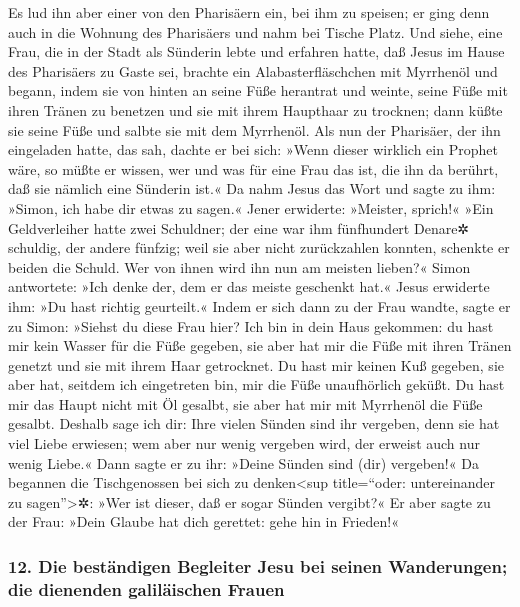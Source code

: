  Es lud ihn aber einer von den Pharisäern ein, bei ihm zu
speisen; er ging denn auch in die Wohnung des Pharisäers und nahm bei
Tische Platz.  Und siehe, eine Frau, die in der Stadt als
Sünderin lebte und erfahren hatte, daß Jesus im Hause des Pharisäers zu
Gaste sei, brachte ein Alabasterfläschchen mit Myrrhenöl 
und begann, indem sie von hinten an seine Füße herantrat und weinte,
seine Füße mit ihren Tränen zu benetzen und sie mit ihrem Haupthaar zu
trocknen; dann küßte sie seine Füße und salbte sie mit dem Myrrhenöl.
 Als nun der Pharisäer, der ihn eingeladen hatte, das
sah, dachte er bei sich: »Wenn dieser wirklich ein Prophet wäre, so
müßte er wissen, wer und was für eine Frau das ist, die ihn da berührt,
daß sie nämlich eine Sünderin ist.«  Da nahm Jesus das
Wort und sagte zu ihm: »Simon, ich habe dir etwas zu sagen.« Jener
erwiderte: »Meister, sprich!«  »Ein Geldverleiher hatte
zwei Schuldner; der eine war ihm fünfhundert Denare✲ schuldig, der
andere fünfzig;  weil sie aber nicht zurückzahlen
konnten, schenkte er beiden die Schuld. Wer von ihnen wird ihn nun am
meisten lieben?«  Simon antwortete: »Ich denke der, dem
er das meiste geschenkt hat.« Jesus erwiderte ihm: »Du hast richtig
geurteilt.«  Indem er sich dann zu der Frau wandte, sagte
er zu Simon: »Siehst du diese Frau hier? Ich bin in dein Haus gekommen:
du hast mir kein Wasser für die Füße gegeben, sie aber hat mir die Füße
mit ihren Tränen genetzt und sie mit ihrem Haar getrocknet.
 Du hast mir keinen Kuß gegeben, sie aber hat, seitdem
ich eingetreten bin, mir die Füße unaufhörlich geküßt. 
Du hast mir das Haupt nicht mit Öl gesalbt, sie aber hat mir mit
Myrrhenöl die Füße gesalbt.  Deshalb sage ich dir: Ihre
vielen Sünden sind ihr vergeben, denn sie hat viel Liebe erwiesen; wem
aber nur wenig vergeben wird, der erweist auch nur wenig Liebe.«
 Dann sagte er zu ihr: »Deine Sünden sind (dir)
vergeben!«  Da begannen die Tischgenossen bei sich zu
denken\textless sup title=``oder: untereinander zu sagen''\textgreater✲:
»Wer ist dieser, daß er sogar Sünden vergibt?«  Er aber
sagte zu der Frau: »Dein Glaube hat dich gerettet: gehe hin in Frieden!«

\hypertarget{die-bestuxe4ndigen-begleiter-jesu-bei-seinen-wanderungen-die-dienenden-galiluxe4ischen-frauen}{%
\subsubsection{12. Die beständigen Begleiter Jesu bei seinen
Wanderungen; die dienenden galiläischen
Frauen}\label{die-bestuxe4ndigen-begleiter-jesu-bei-seinen-wanderungen-die-dienenden-galiluxe4ischen-frauen}}

